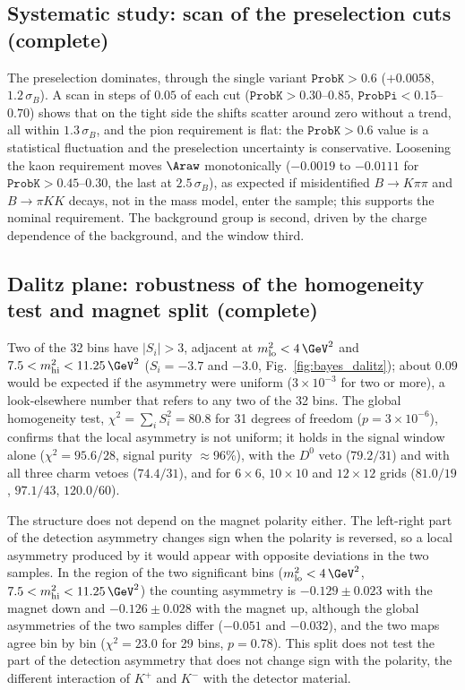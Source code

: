\subsection{Systematic study: scan of the preselection cuts (complete)}
The preselection dominates, through the single variant $\texttt{ProbK}>0.6$ ($+0.0058$, $1.2\,\sigma_B$). A scan in steps of $0.05$ of each cut ($\texttt{ProbK}>0.30$--$0.85$, $\texttt{ProbPi}<0.15$--$0.70$) shows that on the tight side the shifts scatter around zero without a trend, all within $1.3\,\sigma_B$, and the pion requirement is flat: the $\texttt{ProbK}>0.6$ value is a statistical fluctuation and the preselection uncertainty is conservative. Loosening the kaon requirement moves $\Araw$ monotonically ($-0.0019$ to $-0.0111$ for $\texttt{ProbK}>0.45$--$0.30$, the last at $2.5\,\sigma_B$), as expected if misidentified $B\to K\pi\pi$ and $B\to\pi KK$ decays, not in the mass model, enter the sample; this supports the nominal requirement. The background group is second, driven by the charge dependence of the background, and the window third.

\subsection{Dalitz plane: robustness of the homogeneity test and magnet split (complete)}
Two of the 32 bins have $|S_i|>3$, adjacent at $m^2_{\mathrm{lo}}<4\,\GeV^2$ and $7.5<m^2_{\mathrm{hi}}<11.25\,\GeV^2$ ($S_i=-3.7$ and $-3.0$, Fig.~\ref{fig:bayes_dalitz}); about $0.09$ would be expected if the asymmetry were uniform ($3\times10^{-3}$ for two or more), a look-elsewhere number that refers to any two of the 32 bins. The global homogeneity test, $\chi^2=\sum_iS_i^2=80.8$ for 31 degrees of freedom ($p=3\times10^{-6}$), confirms that the local asymmetry is not uniform; it holds in the signal window alone ($\chi^2=95.6/28$, signal purity $\approx$96\%), with the $D^0$ veto ($79.2/31$) and with all three charm vetoes ($74.4/31$), and for $6\times6$, $10\times10$ and $12\times12$ grids ($81.0/19$, $97.1/43$, $120.0/60$).

The structure does not depend on the magnet polarity either. The left-right part of the detection asymmetry changes sign when the polarity is reversed, so a local asymmetry produced by it would appear with opposite deviations in the two samples. In the region of the two significant bins ($m^2_{\mathrm{lo}}<4\,\GeV^2$, $7.5<m^2_{\mathrm{hi}}<11.25\,\GeV^2$) the counting asymmetry is $-0.129\pm0.023$ with the magnet down and $-0.126\pm0.028$ with the magnet up, although the global asymmetries of the two samples differ ($-0.051$ and $-0.032$), and the two maps agree bin by bin ($\chi^2=23.0$ for 29 bins, $p=0.78$). This split does not test the part of the detection asymmetry that does not change sign with the polarity, the different interaction of $K^+$ and $K^-$ with the detector material.

